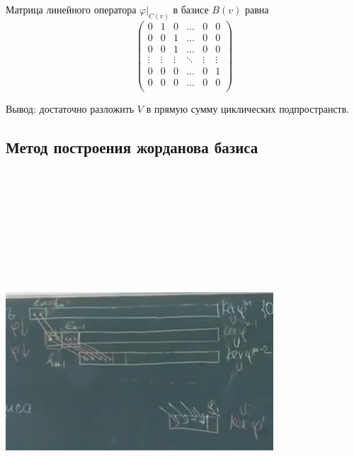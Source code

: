 \vspace{\baselineskip}
Матрица линейного оператора $\varphi|_{C(v)}$ в базисе $B(v)$ равна \[\begin{pmatrix} 0 & 1 & 0 & \dots & 0 & 0 \\ 0 & 0 & 1 & \dots & 0 & 0 \\ 0 & 0 & 1 & \dots & 0 & 0 \\ \vdots & \vdots & \vdots & \ddots & \vdots & \vdots \\ 0 & 0 & 0 & \dots & 0 & 1 \\ 0 & 0 & 0 & \dots & 0 & 0 \\ \end{pmatrix}\]

Вывод: достаточно разложить $V$ в прямую сумму циклических подпространств.

\subsection{Метод построения жорданова базиса}

\vspace{\baselineskip}
\includegraphics[width=10cm,height=15cm,keepaspectratio]{example7.jpg}

